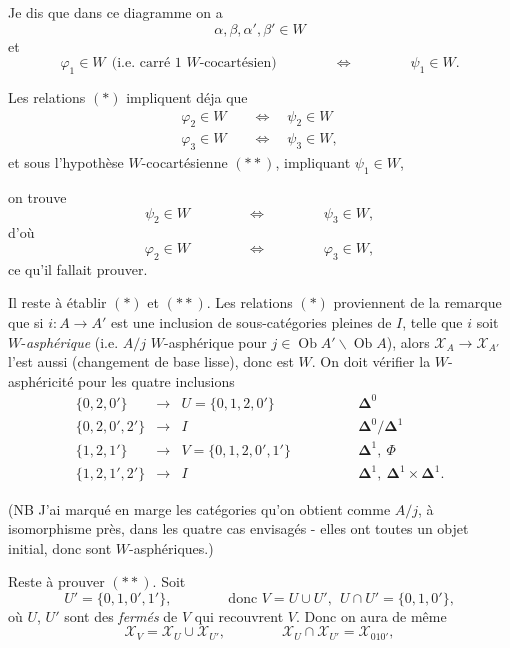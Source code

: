\documentclass[11pt]{article}
\newcommand{\printedpage}[1]{\marginpar{\footnotesize p.~#1}}
\newcommand{\msp}[1]{\marginpar{\footnotesize [#1]}}
\newcommand{\cX}{\mathscr{X}}
\newcommand{\Ob}{\operatorname{Ob}}
\begin{document}
Je dis que dans ce diagramme on a
\[
\alpha, \beta, \alpha', \beta' \in W
\tag*{$(\ast)$}
\]
et
\[
\varphi_1 \in W \ \ \text{(i.e. carré 1 $W$-cocartésien)} \qquad\qquad \Longleftrightarrow \qquad\qquad \psi_1 \in W.
\tag*{$(\ast\ast)$}
\]

Les relations $(\ast)$ impliquent déja que %
\[
\begin{aligned}
\varphi_2 \in W \quad &\Longleftrightarrow \quad \psi_2 \in W \\
\varphi_3 \in W \quad &\Longleftrightarrow \quad \psi_3 \in W,
\end{aligned}
\]
et sous l'hypothèse $W$-cocartésienne $(\ast\ast)$, impliquant $\psi_1 \in W$,

\msp{page 238}

on trouve
\[
\psi_2 \in W \qquad\qquad \Longleftrightarrow \qquad\qquad \psi_3 \in W,
\]
d'où
\[
\varphi_2 \in W \qquad\qquad \Longleftrightarrow \qquad\qquad \varphi_3 \in W,
\]
ce qu'il fallait prouver.

Il reste à établir $(\ast)$ et $(\ast\ast)$. Les relations $(\ast)$ proviennent de la remarque que si $i : A \longrightarrow A'$ est une inclusion de sous-catégories pleines de $I$, telle que $i$ soit $W$-\textit{asphérique} (i.e. $A/j$ $W$-asphérique pour $j \in \Ob A'\backslash\Ob A$), alors $\cX_A \longrightarrow \cX_{A'}$ l'est aussi (changement de base lisse), donc est $W$. On doit vérifier la $W$-asphéricité pour les quatre inclusions
\[
\begin{array}{rcll}
\{0,2,0'\} & \longrightarrow & U = \{0,1,2,0'\} & \qquad\qquad \mathbf{\Delta}^0 \\[1ex]
\{0,2,0',2'\} & \longrightarrow & I & \qquad\qquad \mathbf{\Delta}^0/\mathbf{\Delta}^1 \\[1ex]
\{1,2,1'\} & \longrightarrow & V = \{0,1,2,0',1'\} & \qquad\qquad \mathbf{\Delta}^1,\ \Phi \\[1ex]
\{1,2,1',2'\} & \longrightarrow & I & \qquad\qquad \mathbf{\Delta}^1,\ \mathbf{\Delta}^1 \times \mathbf{\Delta}^1.
\end{array}
\]

\printedpage{154}

(NB J'ai marqué en marge les catégories qu'on obtient comme $A/j$, à isomorphisme près, dans les quatre cas envisagés - elles ont toutes un objet initial, donc sont $W$-asphériques.)

Reste à prouver $(\ast\ast)$. Soit
\[
U' = \{0,1,0',1'\}, \qquad\qquad \text{donc } V = U \cup U',\ \ U \cap U' = \{0,1,0'\},
\]
où $U$, $U'$ sont des \textit{fermés} de $V$ qui recouvrent $V$. Donc on aura de même
\[
\cX_V = \cX_U \cup \cX_{U'}, \qquad\qquad \cX_U \cap \cX_{U'} = \cX_{010'},
\]
\end{document}
